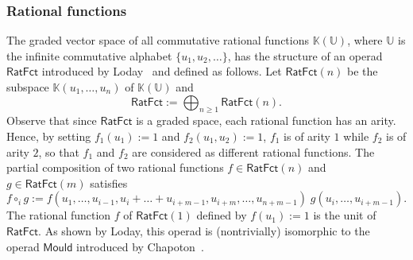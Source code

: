 \documentclass[10pt,reqno]{amsart}
\numberwithin{equation}{subsection}
\renewcommand{\geq}{\geqslant}
\newcommand{\K}{\mathbb{K}}
\newcommand{\Ubb}{\mathbb{U}}
\newcommand{\RatFct}{\mathsf{RatFct}}
\newcommand{\Mould}{\mathsf{Mould}}
\begin{document}
\subsubsection{Rational functions}%
\label{subsubsec:rational_functions}
The graded vector space of all commutative rational functions
$\K(\Ubb)$, where $\Ubb$ is the infinite commutative alphabet
$\{u_1, u_2, \dots\}$, has the structure of an operad $\RatFct$
introduced by Loday~\cite{Lod10} and defined as follows. Let
$\RatFct(n)$ be the subspace $\K(u_1, \dots, u_n)$ of $\K(\Ubb)$ and
\begin{equation}
    \RatFct := \bigoplus_{n \geq 1} \RatFct(n).
\end{equation}
Observe that since $\RatFct$ is a graded space, each rational function
has an arity. Hence, by setting $f_1(u_1) := 1$ and $f_2(u_1, u_2) := 1$,
$f_1$ is of arity $1$ while $f_2$ is of arity $2$, so that $f_1$ and
$f_2$ are considered as different rational functions. The partial
composition of two rational functions $f \in \RatFct(n)$ and
$g \in \RatFct(m)$ satisfies
\begin{equation} \label{equ:partial_composition_RatFct}
    f \circ_i g :=
    f\left(u_1, \dots, u_{i - 1}, u_i + \dots + u_{i + m - 1},
        u_{i + m}, \dots, u_{n + m - 1}\right)
    \;
    g\left(u_i, \dots, u_{i + m - 1}\right).
\end{equation}
The rational function $f$ of $\RatFct(1)$ defined by $f(u_1) := 1$ is
the unit of~$\RatFct$. As shown by Loday, this operad is (nontrivially)
isomorphic to the operad $\Mould$ introduced by Chapoton~\cite{Cha07}.
\medskip
\end{document}
